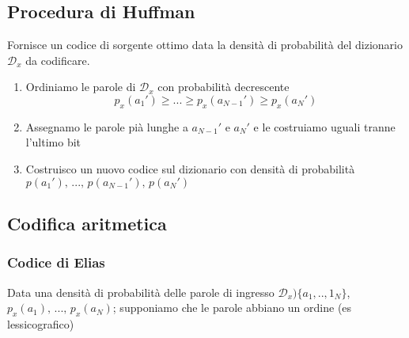 \documentclass{article}
\begin{document}
\subsection{Procedura di Huffman}
Fornisce un codice di sorgente ottimo data la densità di probabilità del dizionario $\mathcal{D}_x$ da codificare.
\begin{enumerate}
	\item Ordiniamo le parole di $\mathcal{D}_x$ con probabilità decrescente $$p_x(a_1')\geq...\geq p_x(a_{N-1}')\geq p_x(a_N')$$
	\item Assegnamo le parole pià lunghe a $a_{N-1}'$ e $a_N'$ e le costruiamo uguali tranne l'ultimo bit
	\item Costruisco un nuovo codice sul dizionario con densità di probabilità\\ $p(a_1'),\,...,\,p(a_{N-1}'),\,p(a_N')$
\end{enumerate}

\subsection{Codifica aritmetica}

\subsubsection{Codice di Elias}
Data una densità di probabilità delle parole di ingresso $\mathcal{D}_x)\{a_1,..,1_N\}$, $p_x(a_1),\,...,\,p_x(a_N)$; supponiamo che le parole abbiano un ordine (es lessicografico)
\end{document}
